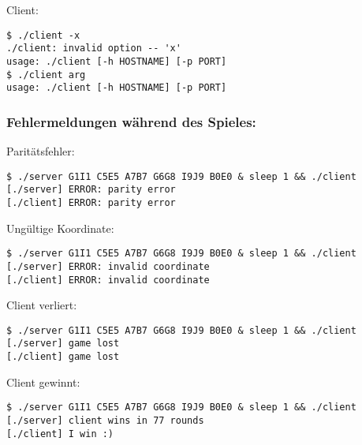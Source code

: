Client:
\vspace{-10pt}
\begin{verbatim}
$ ./client -x
./client: invalid option -- 'x'
usage: ./client [-h HOSTNAME] [-p PORT]
$ ./client arg
usage: ./client [-h HOSTNAME] [-p PORT]
\end{verbatim}

\subsubsection*{Fehlermeldungen während des Spieles:}
\vspace{-10pt}
Paritätsfehler:
\vspace{-10pt}
\begin{verbatim}
$ ./server G1I1 C5E5 A7B7 G6G8 I9J9 B0E0 & sleep 1 && ./client
[./server] ERROR: parity error
[./client] ERROR: parity error
\end{verbatim}

Ungültige Koordinate:
\vspace{-10pt}
\begin{verbatim}
$ ./server G1I1 C5E5 A7B7 G6G8 I9J9 B0E0 & sleep 1 && ./client
[./server] ERROR: invalid coordinate
[./client] ERROR: invalid coordinate
\end{verbatim}

Client verliert:
\vspace{-10pt}
\begin{verbatim}
$ ./server G1I1 C5E5 A7B7 G6G8 I9J9 B0E0 & sleep 1 && ./client
[./server] game lost
[./client] game lost
\end{verbatim}

Client gewinnt:
\vspace{-10pt}
\begin{verbatim}
$ ./server G1I1 C5E5 A7B7 G6G8 I9J9 B0E0 & sleep 1 && ./client
[./server] client wins in 77 rounds
[./client] I win :)
\end{verbatim}

\osueguidelinesone



